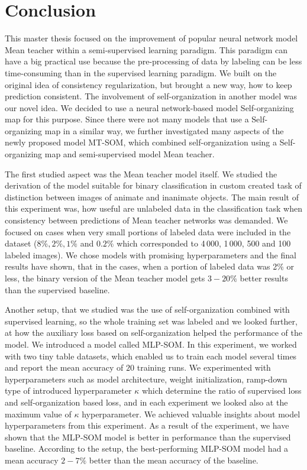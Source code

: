 \chapter*{Conclusion} %

This master thesis focused on the improvement of popular neural network model Mean teacher within a semi-supervised learning paradigm. This paradigm can have a big practical use because the pre-processing of data by labeling can be less time-consuming than in the supervised learning paradigm. We built on the original idea of consistency regularization, but brought a new way, how to keep prediction consistent. The involvement of self-organization in another model was our novel idea. We decided to use a neural network-based model Self-organizing map for this purpose. Since there were not many models that use a Self-organizing map in a similar way, we further investigated many aspects of the newly proposed model MT-SOM, which combined self-organization using a Self-organizing map and semi-supervised model Mean teacher. 

The first studied aspect was the Mean teacher model itself. We studied the derivation of the model suitable for binary classification in custom created task of distinction between images of animate and inanimate objects. The main result of this experiment was, how useful are unlabeled data in the classification task when consistency between predictions of Mean teacher networks was demanded. We focused on cases when very small portions of labeled data were included in the dataset ($8\%, 2\%, 1\%$ and $0.2\%$ which corresponded to 4\,000, 1\,000, 500 and 100 labeled images). We chose models with promising hyperparameters and the final results have shown, that in the cases, when a portion of labeled data was 2\% or less, the binary version of the Mean teacher model gets $3-20\%$ better results than the supervised baseline.

Another setup, that we studied was the use of self-organization combined with supervised learning, so the whole training set was labeled and we looked further, at how the auxiliary loss based on self-organization helped the performance of the model. We introduced a model called MLP-SOM. In this experiment, we worked with two tiny table datasets, which enabled us to train each model several times and report the mean accuracy of $20$ training runs. We experimented with hyperparameters such as model architecture, weight initialization, ramp-down type of introduced hyperparameter $\kappa$ which determine the ratio of supervised loss and self-organization based loss, and in each experiment we looked also at the maximum value of $\kappa$ hyperparameter. We achieved valuable insights about model hyperparameters from this experiment. As a result of the experiment, we have shown that the MLP-SOM model is better in performance than the supervised baseline. According to the setup, the best-performing MLP-SOM model had a mean accuracy $2-7\%$ better than the mean accuracy of the baseline.

